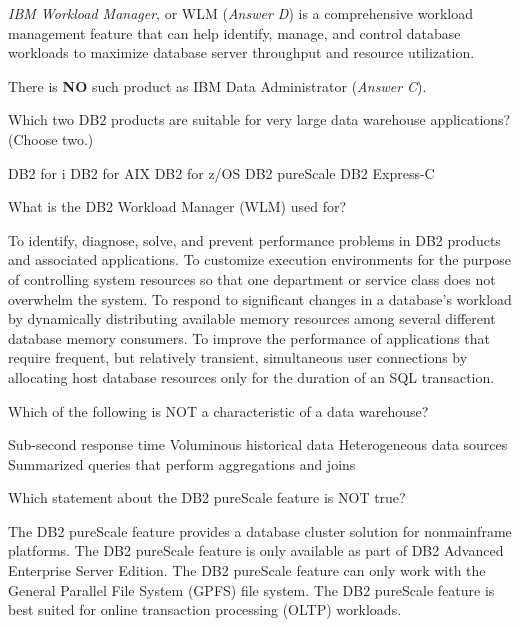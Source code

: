 \documentclass[answers, 11pt]{exam}
\begin{document}
\begin{questions}
\begin{solution}
\textit{IBM Workload Manager}, or WLM (\textit{Answer D}) is a comprehensive workload
management feature that can help identify, manage, and control database workloads to
maximize database server throughput and resource utilization.
\par

There is \textbf{NO} such product as IBM Data Administrator (\textit{Answer C}).

\end{solution}


\question[1]
Which two DB2 products are suitable for very large data warehouse applications? (Choose two.)
\begin{choices}
\choice DB2 for i
\choice DB2 for AIX
\choice DB2 for z/OS
\choice DB2 pureScale
\choice DB2 Express-C
\end{choices}

\question[1]
What is the DB2 Workload Manager (WLM) used for?
\begin{choices}
\choice To identify, diagnose, solve, and prevent performance problems in DB2 products and associated applications.
\choice To customize execution environments for the purpose of controlling system resources so that one
		department or service class does not overwhelm the system.
\choice To respond to significant changes in a database's workload by dynamically distributing available memory resources
		among several different database memory consumers.
\choice To improve the performance of applications that require frequent, but relatively transient, simultaneous user
		connections by allocating host database resources only for the duration of an SQL transaction.
\end{choices}

\question[1]
Which of the following is NOT a characteristic of a data warehouse?
\begin{choices}
\choice Sub-second response time
\choice Voluminous historical data
\choice Heterogeneous data sources
\choice Summarized queries that perform aggregations and joins
\end{choices}

\newpage
\addpoints
\question[1]
Which statement about the DB2 pureScale feature is NOT true?
\begin{choices}
\choice The DB2 pureScale feature provides a database cluster solution for nonmainframe platforms.
\choice The DB2 pureScale feature is only available as part of DB2 Advanced Enterprise Server Edition.
\choice The DB2 pureScale feature can only work with the General Parallel File System (GPFS) file system.
\choice The DB2 pureScale feature is best suited for online transaction processing (OLTP) workloads.
\end{choices}


\end{questions}
\end{document}
